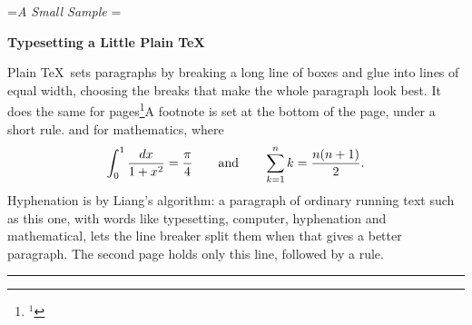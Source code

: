 \headline={\hfil\sl A Small Sample\hfil}
\footline={\hfil\folio\hfil}
\centerline{\bf Typesetting a Little Plain TeX}
\medskip
\noindent Plain \TeX\ sets paragraphs by breaking a long line of boxes and glue
into lines of equal width, choosing the breaks that make the whole paragraph
look best. It does the same for pages\footnote{$^1$}{A footnote is set at the
bottom of the page, under a short rule.} and for mathematics, where
$$\int_0^1 {dx\over 1+x^2}={\pi\over4}\qquad\hbox{and}\qquad
\sum_{k=1}^{n}k={n(n+1)\over2}.$$
\medskip
{}
\bigskip
\noindent Hyphenation is by Liang's algorithm: a paragraph of ordinary running
text such as this one, with words like typesetting, computer, hyphenation and
mathematical, lets the line breaker split them when that gives a better paragraph.
\vfill\eject
\noindent The second page holds only this line, followed by a rule.
\vskip 1in \hrule
\vfill\eject
